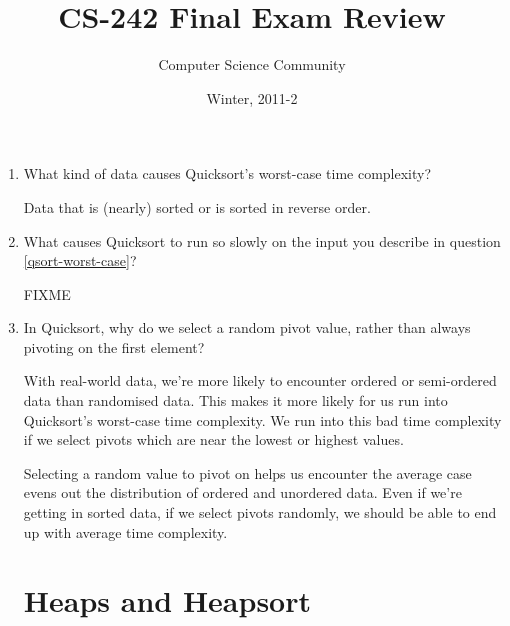\documentclass[11pt]{article}
\author{Computer Science Community}
\title{CS-242 Final Exam Review}
\date{Winter, 2011-2}
\makeatletter
\newenvironment{answer}{\large\lstset{basicstyle=\large}\color{white}}{}
\newenvironment{answer}{\large\lstset{basicstyle=\large}\color{red}}{}
\let\thetitle\@title
\let\thedate\@date
\makeatother
\begin{document}
\noindent{\Large \thetitle \hfill \thedate}

\begin{enumerate}
\section*{Backtracking}
\section*{Hashing and Hash Tables}
\section*{Sorting}

\item\label{qsort-worst-case} What kind of data causes Quicksort's worst-case
      time complexity?

      \begin{answer}
      Data that is (nearly) sorted or is sorted in reverse order.
      \end{answer}

\item What causes Quicksort to run so slowly on the input you describe in
      question \ref{qsort-worst-case}?

    \begin{answer}
    {\huge FIXME}
    \end{answer}

\item In Quicksort, why do we select a random pivot value, rather than always
      pivoting on the first element?

      \begin{answer}
      With real-world data, we're more likely to encounter ordered or
      semi-ordered data than randomised data. This makes it more likely for us
      run into Quicksort's worst-case time complexity. We run into this bad
      time complexity if we select pivots which are near the lowest or highest
      values.

      Selecting a random value to pivot on helps us encounter the average case
      evens out the distribution of ordered and unordered data. Even if we're
      getting in sorted data, if we select pivots randomly, we should be able
      to end up with average time complexity.
      \end{answer}

\section*{Heaps and Heapsort}


\end{enumerate}
\end{document}
